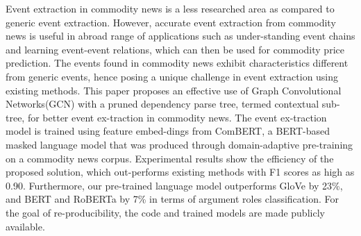 Event extraction in commodity news is a less researched area as compared to generic event extraction.    However,  accurate  event  extraction  from  commodity  news  is  useful  in  abroad  range  of  applications  such  as  under-standing event chains and learning event-event relations,  which  can  then  be  used  for  commodity  price  prediction. The  events  found in commodity news exhibit characteristics different  from  generic  events,  hence  posing  a unique challenge in event extraction using existing  methods.    This  paper  proposes  an  effective use of Graph Convolutional Networks(GCN)  with  a  pruned  dependency  parse  tree, termed contextual sub-tree, for better event ex-traction  in  commodity  news.   The  event  ex-traction model is trained using feature embed-dings from ComBERT, a BERT-based masked language  model  that  was  produced  through domain-adaptive pre-training on a commodity news  corpus.   Experimental  results  show  the efficiency of the proposed solution, which out-performs existing methods with F1 scores as high as 0.90. Furthermore, our pre-trained language model outperforms GloVe by 23\%, and BERT and RoBERTa by 7\% in terms of argument  roles  classification.   For  the  goal  of  re-producibility, the code and trained models are made publicly available.
